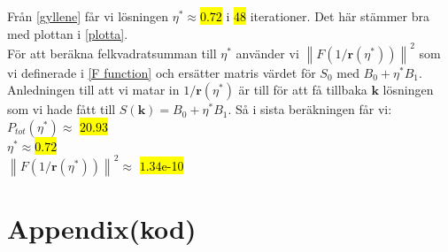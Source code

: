 \documentclass{assignment}
\def\code#1{\texttt{#1}}
\begin{document}
 
Från \cref{gyllene} får vi lösningen $\eta^*\approx$\hl{$0.72$} i \hl{48} iterationer. Det här stämmer bra med plottan i \cref{plotta}.
\\ För att beräkna felkvadratsumman till $\eta^*$ använder vi $\left\|F(1/\mathbf{r}(\eta^*))\right\|^2$ som vi definerade i \cref{F function} och ersätter matris värdet för $S_0$ med $B_0+\eta^* B_1 $.
Anledningen till att vi matar in $1/\mathbf{r}(\eta^*)$ är till för att få tillbaka $\mathbf{k}$ lösningen som vi hade fått till $S(\mathbf{k})=B_0+\eta^* B_1 $. Så i sista beräkningen får vi:
\\ $P_{tot}(\eta^*) \approx$ \hl{$20.93$}
\\ $\eta^*\approx$\hl{$0.72$}
\\ $\left\|F(1/\mathbf{r}(\eta^*))\right\|^2 \approx$ \hl{$1.34$e-10}

\newpage
\section*{Appendix(kod)}
 
\end{document}
